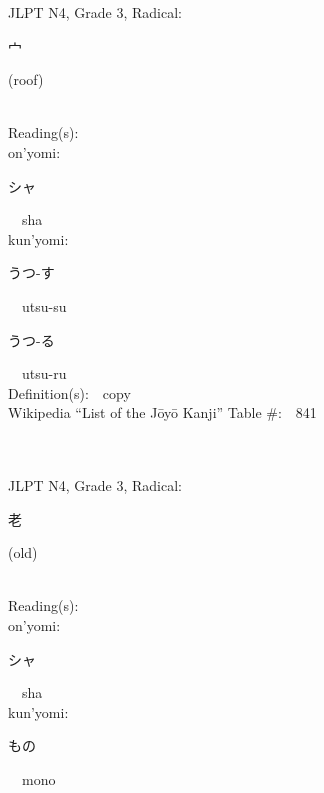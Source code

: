 \begin{multicols}{2}
{JLPT N4, Grade 3, Radical:\ \ {\begin{CJK}{UTF8}{min} 宀 \end{CJK}} (roof) } \\
Reading(s):\ \ \\
{\hspace*{1em}}on'yomi:\ \ \\
{\hspace*{2em}}{\begin{CJK}{UTF8}{min} シャ \end{CJK}}\ \ sha\ \ \\
{\hspace*{1em}}kun'yomi:\ \ \\
{\hspace*{2em}}{\begin{CJK}{UTF8}{min} うつ-す \end{CJK}}\ \ utsu-su\ \ \\
{\hspace*{2em}}{\begin{CJK}{UTF8}{min} うつ-る \end{CJK}}\ \ utsu-ru\ \ \\
Definition(s):\ \ copy \\
Wikipedia ``List of the J\=oy\=o Kanji'' Table \#:\ \ 841 \\
\ \ \\
{\fontsize{34pt}{40pt}  }\ \ \\  %
{JLPT N4, Grade 3, Radical:\ \ {\begin{CJK}{UTF8}{min} 老 \end{CJK}} (old) } \\
Reading(s):\ \ \\
{\hspace*{1em}}on'yomi:\ \ \\
{\hspace*{2em}}{\begin{CJK}{UTF8}{min} シャ \end{CJK}}\ \ sha\ \ \\
{\hspace*{1em}}kun'yomi:\ \ \\
{\hspace*{2em}}{\begin{CJK}{UTF8}{min} もの \end{CJK}}\ \ mono\ \ \\

\end{multicols}
